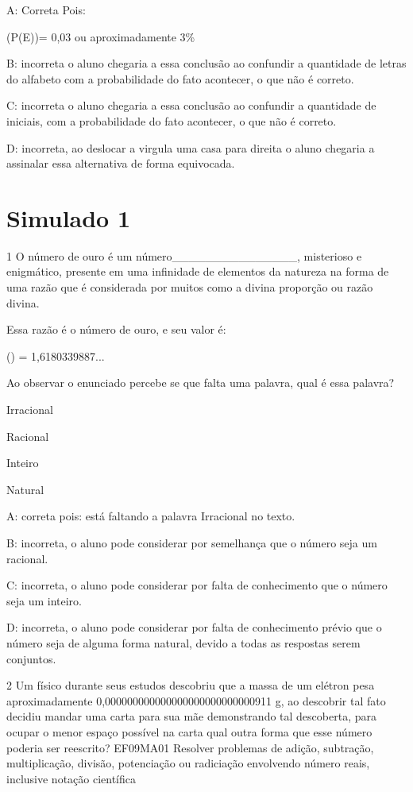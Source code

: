 A: Correta Pois:

(P(E))= 0,03 ou aproximadamente 3\%

B: incorreta o aluno chegaria a essa conclusão ao confundir a quantidade
de letras do alfabeto com a probabilidade do fato acontecer, o que não é
correto.

C: incorreta o aluno chegaria a essa conclusão ao confundir a quantidade
de iniciais, com a probabilidade do fato acontecer, o que não é correto.

D: incorreta, ao deslocar a virgula uma casa para direita o aluno
chegaria a assinalar essa alternativa de forma equivocada.

\section{Simulado 1}

\num{1} O número de ouro é um número\_\_\_\_\_\_\_\_\_\_\_\_\_\_\_,
misterioso e enigmático, presente em uma infinidade de elementos da
natureza na forma de uma razão que é considerada por muitos como a
divina proporção ou razão divina.

Essa razão é o número de ouro, e seu valor é:

() = 1,6180339887...

Ao observar o enunciado percebe se que falta uma palavra, qual é essa
palavra?

\item Irracional
\item Racional
\item Inteiro
\item Natural

A: correta pois: está faltando a palavra Irracional no texto.

B: incorreta, o aluno pode considerar por semelhança que o número seja
um racional.

C: incorreta, o aluno pode considerar por falta de conhecimento que o
número seja um inteiro.

D: incorreta, o aluno pode considerar por falta de conhecimento prévio
que o número seja de alguma forma natural, devido a todas as respostas
serem conjuntos.

\num{2} Um físico durante seus estudos descobriu que a massa de um elétron
pesa aproximadamente 0,000000000000000000000000000911 g, ao descobrir
tal fato decidiu mandar uma carta para sua mãe demonstrando tal
descoberta, para ocupar o menor espaço possível na carta qual outra
forma que esse número poderia ser reescrito? EF09MA01 Resolver problemas
de adição, subtração, multiplicação, divisão, potenciação ou radiciação
envolvendo número reais, inclusive notação científica

